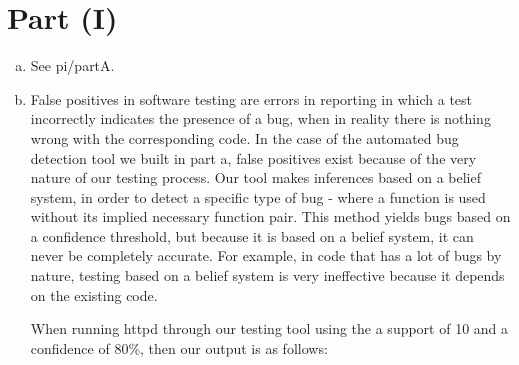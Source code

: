 \documentclass{article}
\begin{document}
  \section*{Part (I)}
  \begin{enumerate}[(a)]
    \item
      See pi/partA.
    \item
      False positives in software testing are errors in reporting in which a test incorrectly indicates the presence of a bug, when in reality there is nothing wrong with the corresponding code. In the case of the automated bug detection tool we built in part a, false positives exist because of the very nature of our testing process. Our tool makes inferences based on a belief system, in order to detect a specific type of bug - where a function is used without its implied necessary function pair. This method yields bugs based on a confidence threshold, but because it is based on a belief system, it can never be completely accurate. For example, in code that has a lot of bugs by nature, testing based on a belief system is very ineffective because it depends on the existing code.

      When running httpd through our testing tool using the a support of 10 and a confidence of 80\%, then our output is as follows:


\end{enumerate}
\end{document}
